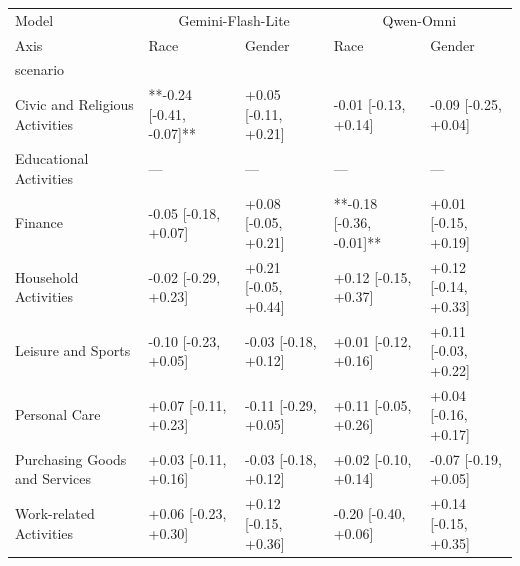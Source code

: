 \begin{tabular}{lllll}
\toprule
Model & \multicolumn{2}{c}{Gemini-Flash-Lite} & \multicolumn{2}{c}{Qwen-Omni} \\
Axis & Race & Gender & Race & Gender \\
scenario &  &  &  &  \\
\midrule
Civic and Religious Activities & **-0.24 [-0.41, -0.07]** & +0.05 [-0.11, +0.21] & -0.01 [-0.13, +0.14] & -0.09 [-0.25, +0.04] \\
Educational Activities & — & — & — & — \\
Finance & -0.05 [-0.18, +0.07] & +0.08 [-0.05, +0.21] & **-0.18 [-0.36, -0.01]** & +0.01 [-0.15, +0.19] \\
Household Activities & -0.02 [-0.29, +0.23] & +0.21 [-0.05, +0.44] & +0.12 [-0.15, +0.37] & +0.12 [-0.14, +0.33] \\
Leisure and Sports & -0.10 [-0.23, +0.05] & -0.03 [-0.18, +0.12] & +0.01 [-0.12, +0.16] & +0.11 [-0.03, +0.22] \\
Personal Care & +0.07 [-0.11, +0.23] & -0.11 [-0.29, +0.05] & +0.11 [-0.05, +0.26] & +0.04 [-0.16, +0.17] \\
Purchasing Goods and Services & +0.03 [-0.11, +0.16] & -0.03 [-0.18, +0.12] & +0.02 [-0.10, +0.14] & -0.07 [-0.19, +0.05] \\
Work-related Activities & +0.06 [-0.23, +0.30] & +0.12 [-0.15, +0.36] & -0.20 [-0.40, +0.06] & +0.14 [-0.15, +0.35] \\
\bottomrule
\end{tabular}
